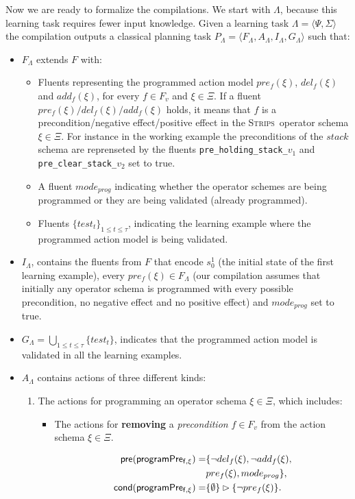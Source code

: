 \documentclass[letterpaper]{article} %
\newcommand{\tup}[1]{{\langle #1 \rangle}}
\newcommand{\pre}{\mathsf{pre}}     %
\newcommand{\cond}{\mathsf{cond}}   %
\newcommand{\strips}{\textsc{Strips}}     %
\begin{document}
Now we are ready to formalize the compilations. We start with $\Lambda$, because this learning task requires fewer input knowledge. Given a learning task $\Lambda=\tup{\Psi,\Sigma}$ the compilation outputs a classical planning task $P_{\Lambda}=\tup{F_{\Lambda},A_{\Lambda},I_{\Lambda},G_{\Lambda}}$ such that:
\begin{itemize}
\item $F_{\Lambda}$ extends $F$ with:
\begin{itemize}
\item Fluents representing the programmed action model $pre_f(\xi)$, $del_f(\xi)$ and $add_f(\xi)$, for every $f\in F_v$ and $\xi \in \Xi$. If a fluent $pre_f(\xi)/del_f(\xi)/add_f(\xi)$ holds, it means that $f$ is a precondition/negative effect/positive effect in the \strips\ operator schema $\xi\in \Xi$. For instance in the working example the preconditions of the $stack$ schema are reprenseted by the fluents {\small\tt pre\_holding\_stack\_$v_1$} and {\small\tt pre\_clear\_stack\_$v_2$} set to true. 
\item A fluent $mode_{prog}$ indicating whether the operator schemes are being programmed or they are being validated (already programmed).
\item Fluents $\{test_t\}_{1\leq t\leq \tau}$, indicating the learning example where the programmed action model is being validated.
\end{itemize}
\item $I_{\Lambda}$, contains the fluents from $F$ that encode $s_0^1$ (the initial state of the first learning example), every $pre_f(\xi)\in F_{\Lambda}$ (our compilation assumes that initially any operator schema is programmed with every possible precondition, no negative effect and no positive effect) and $mode_{prog}$ set to true.
\item $G_{\Lambda}=\bigcup_{1\leq t\leq \tau}\{test_t\}$, indicates that the programmed action model is validated in all the learning examples.
\item $A_{\Lambda}$ contains actions of three different kinds:
\begin{enumerate}
\item The actions for programming an operator schema $\xi\in\Xi$, which includes:
\begin{itemize}
\item The actions for {\bf removing} a {\em precondition} $f\in F_v$ from the action schema $\xi\in\Xi$.

\begin{small}
\begin{align*}
\hspace*{7pt}\pre(\mathsf{programPre_{f,\xi}})=&\{\neg del_{f}(\xi),\neg add_{f}(\xi),\\
& pre_{f}(\xi), mode_{prog}\},\\
\cond(\mathsf{programPre_{f,\xi}})=&\{\emptyset\}\rhd\{\neg pre_{f}(\xi)\}.
\end{align*}
\end{small}


\end{itemize}
\end{enumerate}
\end{itemize}
\end{document}

